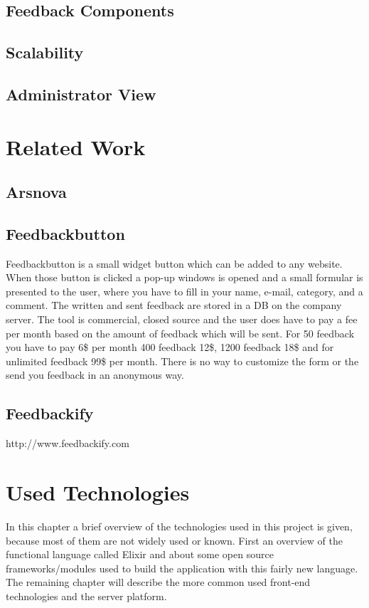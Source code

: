 \section{Feedback Components}

\section{Scalability}

\section{Administrator View}

\chapter{Related Work}
\section{Arsnova}
\section{Feedbackbutton}
Feedbackbutton is a small widget button which can be added to any website. When those button is clicked a pop-up windows is opened and a small formular is presented to the user, where you have to fill in your name, e-mail, category, and a comment. The written and sent feedback are stored in a DB on the company server. The tool is commercial, closed source and the user does have to pay a fee per month based on the amount of feedback which will be sent. For 50 feedback you have to pay 6\$ per month 400 feedback 12\$, 1200 feedback 18\$ and for unlimited feedback 99\$ per month. There is no way to customize the form or the send you feedback in an anonymous way.
\section{Feedbackify}
http://www.feedbackify.com


\chapter{Used Technologies}
In this chapter a brief overview of the technologies used in this project is given, because most of them are not widely used or known. First an overview of the functional language called Elixir and about some open source frameworks/modules used to build the application with this fairly new language. The remaining chapter will describe the more common used front-end technologies and the server platform. 

